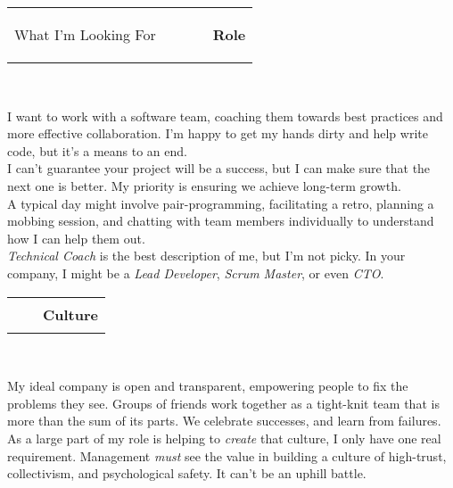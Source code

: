 \documentclass[hidelinks, 12pt, a4paper]{article}
\begin{document}
	\vspace{24pt}
	\begin{tabularx}{\textwidth}{@{}llXrr@{}}
		\begin{Large}What I'm Looking For\end{Large}&
		\rule{80pt}{1pt}&&
		\rule{63pt}{1pt}&
		\textbf{Role}
	\end{tabularx}\\
	
	\begin{multicols}{2}
		I want to work with a software team, coaching them towards best practices and more effective collaboration.
		I'm happy to get my hands dirty and help write code, but it's a means to an end.\\
		
		I can't guarantee your project will be a success, but I can make sure that the next one is better.
		My priority is ensuring we achieve long-term growth.\\
		
		A typical day might involve pair-programming, facilitating a retro, planning a mobbing session, and chatting with team members individually to understand how I can help them out.\\
		
		\emph{Technical Coach} is the best description of me, but I'm not picky. In your company, I might be a \emph{Lead Developer}, \emph{Scrum Master}, or even \emph{CTO}.\\
	\end{multicols}

	\begin{tabularx}{\textwidth}{@{}Xrr@{}}&
		\rule{50pt}{1pt}&
		\textbf{Culture}
	\end{tabularx}\\

	\begin{multicols}{2}
		My ideal company is open and transparent, empowering people to fix the problems they see.
		Groups of friends work together as a tight-knit team that is more than the sum of its parts.
		We celebrate successes, and learn from failures.\\
		
		As a large part of my role is helping to \emph{create} that culture, I only have one real requirement.
		Management \emph{must} see the value in building a culture of high-trust, collectivism, and psychological safety.
		It can't be an uphill battle.
	\end{multicols}
\end{document}
